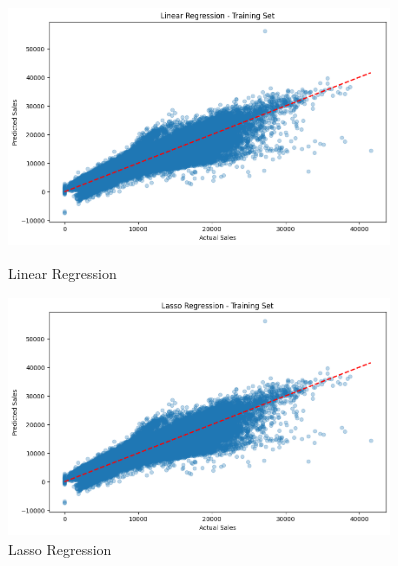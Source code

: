 \documentclass{article}
\begin{document}
\begin{figure}[H] %
    \centering

    \begin{minipage}{0.48\textwidth}
        \centering
        \includegraphics[width=0.9\textwidth]{Linear.png}
        \caption{Linear Regression}
        \label{linear} %
    \end{minipage}\hfill
    \begin{minipage}{0.48\textwidth}
        \centering
        \includegraphics[width=0.9\textwidth]{lasso.png}
        \caption{Lasso Regression}
        \label{lasso} %
    \end{minipage}


\end{figure}
\end{document}
